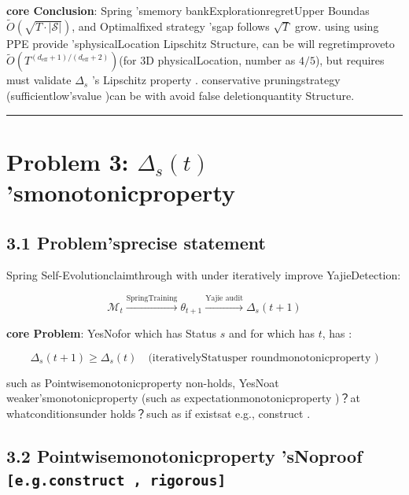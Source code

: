 \documentclass[
  12pt,
]{article}
\begin{document}
\textbf{core Conclusion}: Spring 'smemory bankExplorationregretUpper Boundas 
\(\tilde{O}(\sqrt{T \cdot |\mathcal{S}|})\), and Optimalfixed strategy 'sgap follows
\(\sqrt{T}\) grow. using using  PPE provide 'sphysicalLocation Lipschitz
Structure, can be will regretimproveto 
\(\tilde{O}(T^{(d_{\text{eff}}+1)/(d_{\text{eff}}+2)})\)(for  3D
physicalLocation, number as  \(4/5\)), but requires must validate  \(\Delta_s\) 's Lipschitz
property . conservative pruningstrategy (sufficientlow'svalue )can be with avoid false deletionquantity Structure. 

\begin{center}\rule{0.5\linewidth}{0.5pt}\end{center}

\section{\texorpdfstring{Problem 3: \(\Delta_s(t)\)
'smonotonicproperty }{Problem 3: \textbackslash Delta\_s(t) 'smonotonicproperty }}\label{ux95eeux9898-3delta_st-ux7684ux5355ux8c03ux6027}

\subsection{3.1
Problem'sprecise statement}\label{ux95eeux9898ux7684ux7cbeux786eux9648ux8ff0}

Spring Self-Evolutionclaimthrough with under iteratively improve YajieDetection: 

\[\mathcal{M}_t \xrightarrow{\text{SpringTraining}} \theta_{t+1} \xrightarrow{\text{Yajie audit}} \Delta_s(t+1)\]

\textbf{core Problem}: YesNofor which has Status \(s\) and for which has  \(t\), has : 

\[\boxed{\Delta_s(t+1) \geq \Delta_s(t) \quad \text{(iterativelyStatusper roundmonotonicproperty )}}\]

such as Pointwisemonotonicproperty non-holds, YesNoat weaker'smonotonicproperty (such as expectationmonotonicproperty )？at whatconditionsunder holds？such as if existsat e.g., construct . 

\subsection{\texorpdfstring{3.2 Pointwisemonotonicproperty 'sNoproof
\texttt{{[}e.g.construct , rigorous{]}}}{3.2 Pointwisemonotonicproperty 'sNo {[}e.g.construct , rigorous{]}}}\label{ux9010ux70b9ux5355ux8c03ux6027ux7684ux5426ux8bc1-ux53cdux4f8bux6784ux9020ux4e25ux683c}
\end{document}
